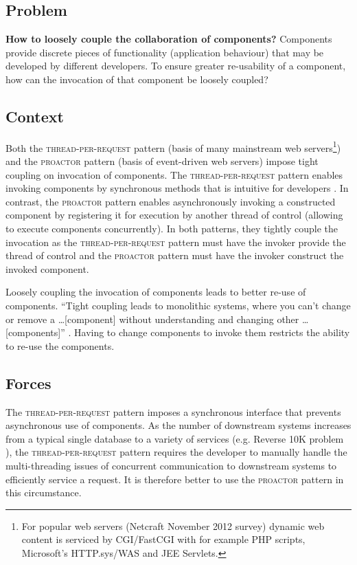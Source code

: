 \documentclass[prodmode]{style/acmlarge}
\begin{document}
\subsection{Problem}

\textbf{How to loosely couple the collaboration of components?}  Components
provide discrete pieces of functionality (application behaviour) that may be
developed by different developers.  To ensure greater re-usability of a
component, how can the invocation of that component be loosely coupled?


\subsection{Context}

Both the \textsc{thread-per-request} pattern \cite{thread-per-request} (basis of
many mainstream web servers\footnote{For popular web servers (Netcraft November
2012 survey) dynamic web content is serviced by CGI/FastCGI with for example PHP
scripts, Microsoft's HTTP.sys/WAS and JEE Servlets.}) and the \textsc{proactor}
pattern \cite{proactor} (basis of event-driven web servers) impose tight
coupling on invocation of components.  The \textsc{thread-per-request} pattern
enables invoking components by synchronous methods that is intuitive for
developers \cite[p. 2]{proactor}.  In contrast, the \textsc{proactor} pattern
enables asynchronously invoking a constructed component by registering it for
execution by another thread of control (allowing to execute components
concurrently).  In both patterns, they tightly couple the invocation as the
\textsc{thread-per-request} pattern must have the invoker provide the thread of
control and the \textsc{proactor} pattern must have the invoker construct the
invoked component.

Loosely coupling the invocation of components leads to better re-use of
components.  ``Tight coupling leads to monolithic systems, where you can't
change or remove a \ldots [component] without understanding and changing other
\ldots [components]'' \cite[p. 24-25]{gof}.  Having to change components to
invoke them restricts the ability to re-use the components.


\subsection{Forces}

The \textsc{thread-per-request} pattern imposes a synchronous interface that
prevents asynchronous use of components.  As the number of downstream
systems increases from a typical single database to a variety of services (e.g.
Reverse 10K problem \cite{reverse-ten-k-problem}), the
\textsc{thread-per-request} pattern requires the developer to manually handle
the multi-threading issues of concurrent communication to downstream systems to
efficiently service a request.  It is therefore better to use the
\textsc{proactor} pattern in this circumstance.
\end{document}
